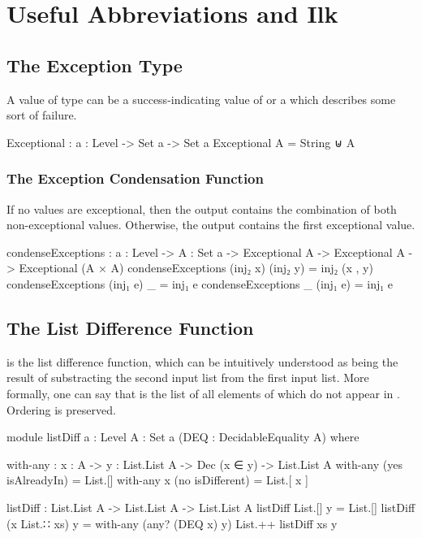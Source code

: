 \documentclass{report}
\begin{document}
\chapter{Useful Abbreviations and Ilk}

\section{The Exception Type}
A value of type   can be a success-indicating value of  or a  which describes some sort of failure.

\begin{code}
Exceptional : {a : Level} -> Set a -> Set a
Exceptional A = String ⊎ A
\end{code}

\subsection{The Exception Condensation Function}
If no values are exceptional, then the output contains the combination of both non-exceptional values.  Otherwise, the output contains the first exceptional value.

\begin{code}
condenseExceptions : {a : Level} ->
                     {A : Set a} ->
                     Exceptional A ->
                     Exceptional A ->
                     Exceptional (A × A)
condenseExceptions (inj₂ x) (inj₂ y) = inj₂ (x , y)
condenseExceptions (inj₁ e) _ = inj₁ e
condenseExceptions _ (inj₁ e) = inj₁ e
\end{code}

\section{The List Difference Function}
 is the list difference function, which can be intuitively understood as being the result of substracting the second input list from the first input list.  More formally, one can say that    is the list of all elements of  which do not appear in .  Ordering is preserved.

\begin{code}
module listDiff
  {a : Level}
  {A : Set a}
  (DEQ : DecidableEquality A) where

  with-any : {x : A} ->
             {y : List.List A} ->
             Dec (x ∈ y) ->
             List.List A
  with-any (yes isAlreadyIn) = List.[]
  with-any {x} (no isDifferent) = List.[ x ]

  listDiff : List.List A -> List.List A -> List.List A
  listDiff List.[] y = List.[]
  listDiff (x List.∷ xs) y = with-any (any? (DEQ x) y) List.++ listDiff xs y
\end{code}
\end{document}
